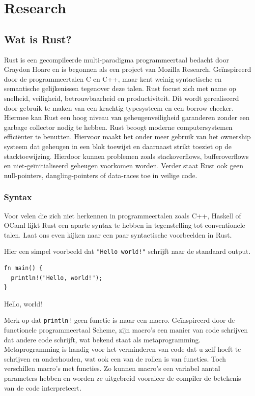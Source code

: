 \chapter{Research}
\label{research}

\section{Wat is Rust?}

Rust is een gecompileerde multi-paradigma programmeertaal bedacht door Graydon Hoare en is begonnen
als een project van Mozilla Research. Geïnspireerd door de programmeertalen C en C++, maar kent
weinig syntactische en semantische gelijkenissen tegenover deze talen. Rust focust zich met name op
snelheid, veiligheid, betrouwbaarheid en productiviteit. Dit wordt gerealiseerd door gebruik te
maken van een krachtig typesysteem en een borrow checker. Hiermee kan Rust een hoog niveau van
geheugenveiligheid garanderen zonder een garbage collector nodig te hebben. Rust beoogt moderne
computersystemen efficiënter te benutten. Hiervoor maakt het onder meer gebruik van het ownership
systeem dat geheugen in een blok toewijst en daarnaast strikt toeziet op de stacktoewijzing.
Hierdoor kunnen problemen zoals stackoverflows, bufferoverflows en niet-geïnitialiseerd geheugen
voorkomen worden. Verder staat Rust ook geen null-pointers, dangling-pointers of data-races toe in
veilige code.

\subsection{Syntax} 

Voor velen die zich niet herkennen in programmeertalen zoals C++, Haskell of OCaml lijkt Rust een
aparte syntax te hebben in tegenstelling tot conventionele talen. Laat ons even kijken naar een paar
syntactische voorbeelden in Rust.


Hier een simpel voorbeeld dat \texttt{"Hello world!"} schrijft naar de standaard output.

\begin{listing}[h]
\begin{verbatim}
fn main() {
  println!("Hello, world!");
}
\end{verbatim}
\caption{Hello, world!}
\end{listing}

\clearpage

Merk op dat \texttt{println!} geen functie is maar een macro. Geïnspireerd door de
functionele programmeertaal Scheme, zijn macro’s een manier van code schrijven dat andere code
schrijft, wat bekend staat als metaprogramming. Metaprogramming is handig voor het verminderen van
code dat u zelf hoeft te schrijven en onderhouden, wat ook een van de rollen is van functies. Toch
verschillen macro’s met functies. Zo kunnen macro’s een variabel aantal parameters hebben en worden
ze uitgebreid vooraleer de compiler de betekenis van de code interpreteert.


